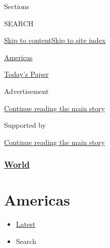 Sections

SEARCH

\protect\hyperlink{site-content}{Skip to
content}\protect\hyperlink{site-index}{Skip to site index}

\href{https://www.nytimes.com/section/world/americas}{Americas}

\href{https://myaccount.nytimes.com/auth/login?response_type=cookie\&client_id=vi}{}

\href{https://www.nytimes.com/section/todayspaper}{Today's Paper}

Advertisement

\protect\hyperlink{after-top}{Continue reading the main story}

Supported by

\protect\hyperlink{after-sponsor}{Continue reading the main story}

\hypertarget{world}{%
\subsubsection{\texorpdfstring{\href{/section/world}{World}}{World}}\label{world}}

\hypertarget{americas}{%
\section{Americas}\label{americas}}

\begin{itemize}
\tightlist
\item
  \protect\hyperlink{stream-panel}{Latest}
\item
  Search
\end{itemize}

